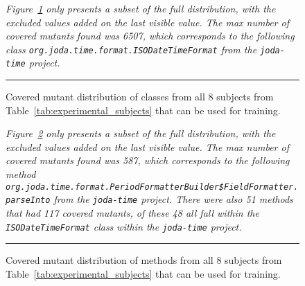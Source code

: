\begin{figure}[ht!]
  \centering
  \caption{Covered mutant distribution of classes from all 8 subjects from Table~\ref{tab:experimental_subjects} that can be used for training.}
  \vspace{1mm}
  \footnotesize{\emph{Figure~\ref{fig:covered_mutant_distributions_class_all} only presents a subset of the full distribution, with the excluded values added on the last visible value. The max number of covered mutants found was 6507, which corresponds to the following class \texttt{org.joda.time.format.ISODateTimeFormat} from the \texttt{joda-time} project.}}
  \vspace{2mm}
  \hrule
  \label{fig:covered_mutant_distributions_class_all}
\end{figure}

\begin{figure}[ht!]
  \centering
  \caption{Covered mutant distribution of methods from all 8 subjects from Table~\ref{tab:experimental_subjects} that can be used for training.}
  \vspace{1mm}
  \footnotesize{\emph{Figure~\ref{fig:covered_mutant_distributions_method_all} only presents a subset of the full distribution, with the excluded values added on the last visible value. The max number of covered mutants found was 587, which corresponds to the following method \texttt{org.joda.time.format.PeriodFormatterBuilder\$FieldFormatter.parseInto} from the \texttt{joda-time} project. There were also 51 methods that had 117 covered mutants, of these 48 all fall within the \texttt{ISODateTimeFormat} class within the \texttt{joda-time} project.}}
  \vspace{2mm}
  \hrule
  \label{fig:covered_mutant_distributions_method_all}
\end{figure}

